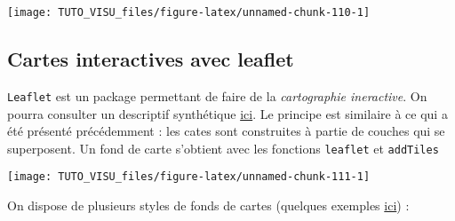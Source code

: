 \documentclass[]{article}
\newenvironment{Shaded}{\begin{snugshade}}{\end{snugshade}}
\newcommand{\DataTypeTok}[1]{\textcolor[rgb]{0.13,0.29,0.53}{#1}}
\newcommand{\KeywordTok}[1]{\textcolor[rgb]{0.13,0.29,0.53}{\textbf{#1}}}
\newcommand{\NormalTok}[1]{#1}
\newcommand{\OperatorTok}[1]{\textcolor[rgb]{0.81,0.36,0.00}{\textbf{#1}}}
\newcommand{\StringTok}[1]{\textcolor[rgb]{0.31,0.60,0.02}{#1}}
\theoremstyle{definition}
\theoremstyle{definition}
\theoremstyle{definition}
\theoremstyle{remark}
\begin{document}
\begin{Shaded}
\end{Shaded}

\begin{center}\texttt{[image: TUTO\_VISU\_files/figure-latex/unnamed-chunk-110-1]} \end{center}

\hypertarget{cartes-interactives-avec-leaflet}{%
\subsection{Cartes interactives avec leaflet}\label{cartes-interactives-avec-leaflet}}

\texttt{Leaflet} est un package permettant de faire de la \emph{cartographie ineractive}. On pourra consulter un descriptif synthétique \href{https://rstudio.github.io/leaflet/}{ici}. Le principe est similaire à ce qui a été présenté précédemment : les cates sont construites à partie de couches qui se superposent. Un fond de carte s'obtient avec les fonctions \texttt{leaflet} et \texttt{addTiles}

\begin{Shaded}
\end{Shaded}

\begin{center}\texttt{[image: TUTO\_VISU\_files/figure-latex/unnamed-chunk-111-1]} \end{center}

On dispose de plusieurs styles de fonds de cartes (quelques exemples \href{http://leaflet-extras.github.io/leaflet-providers/preview/}{ici}) :
\end{document}
